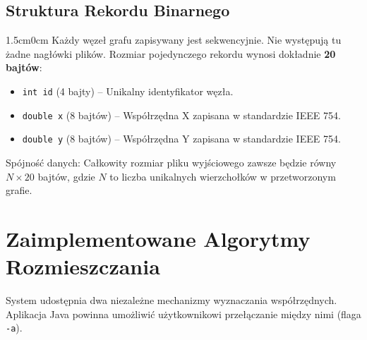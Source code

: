 \documentclass[12pt,a4paper]{article}
\begin{document}
\noindent
\begin{minipage}{\textwidth}
\subsection{Struktura Rekordu Binarnego}
\begin{adjustwidth}{1.5cm}{0cm}
Każdy węzeł grafu zapisywany jest sekwencyjnie. Nie występują tu żadne nagłówki plików. Rozmiar pojedynczego rekordu wynosi dokładnie \textbf{20 bajtów}:
\begin{itemize}
    \item \texttt{int id} (4 bajty) – Unikalny identyfikator węzła.
    \item \texttt{double x} (8 bajtów) – Współrzędna X zapisana w standardzie IEEE 754.
    \item \texttt{double y} (8 bajtów) – Współrzędna Y zapisana w standardzie IEEE 754.
\end{itemize}

Spójność danych: Całkowity rozmiar pliku wyjściowego zawsze będzie równy $N \times 20$ bajtów, gdzie $N$ to liczba unikalnych wierzchołków w przetworzonym grafie.
\end{adjustwidth}
\end{minipage}
\vspace{0.5cm}

\noindent

\vspace{0.5cm}

\section{Zaimplementowane Algorytmy Rozmieszczania}

System udostępnia dwa niezależne mechanizmy wyznaczania współrzędnych. Aplikacja Java powinna umożliwić użytkownikowi przełączanie między nimi (flaga \texttt{-a}).
\end{document}
